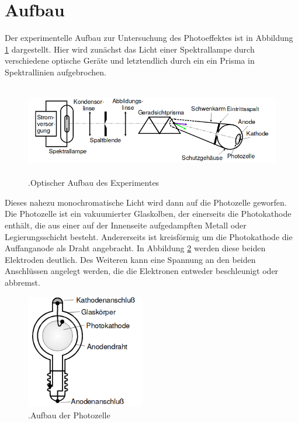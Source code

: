 \section{Aufbau}
Der experimentelle Aufbau zur Untersuchung des Photoeffektes ist in Abbildung \ref{fig:aufbau1} dargestellt.
Hier wird zunächst das Licht einer Spektrallampe durch verschiedene optische Geräte und letztendlich durch ein ein Prisma in Spektrallinien aufgebrochen.

\begin{figure}[h]
    \centering
    \includegraphics[height=4cm]{Aufbau/Aufbau1.png}
    \caption{.Optischer Aufbau des Experimentes}
    \label{fig:aufbau1}
\end{figure}

Dieses nahezu monochromatische Licht wird dann auf die Photozelle geworfen.
Die Photozelle ist ein vakuumierter Glaskolben, der einerseits die Photokathode enthält, die aus einer auf der Innenseite aufgedampften Metall oder Legierungsschicht besteht.
Andererseits ist kreisförmig um die Photokathode die Auffanganode als Draht angebracht.
In Abbildung \ref{fig:aufbau2} werden diese beiden Elektroden deutlich.
Des Weiteren kann eine Spannung an den beiden Anschlüssen angelegt werden, die die Elektronen entweder beschleunigt oder abbremst.

\begin{figure}[h]
    \centering
    \includegraphics[height=5cm]{Aufbau/Aufbau2.png}
    \caption{.Aufbau der Photozelle}
    \label{fig:aufbau2}
\end{figure}
